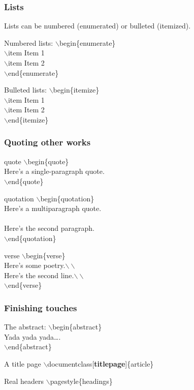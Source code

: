 \documentclass[ignorenonframetext]{beamer}
\begin{document}
\begin{frame}
  \frametitle{Lists}
  Lists can be numbered (enumerated) or bulleted (itemized).
  \begin{block}{Numbered lists:}
    $\backslash$begin\{enumerate\}\\
    \quad$\backslash$item Item 1\\
    \quad$\backslash$item Item 2\\
    $\backslash$end\{enumerate\}
  \end{block}
  \begin{block}{Bulleted lists:}
    $\backslash$begin\{itemize\}\\
    \quad$\backslash$item Item 1\\
    \quad$\backslash$item Item 2\\
    $\backslash$end\{itemize\}
  \end{block}
\end{frame}

\begin{frame}
  \frametitle{Quoting other works}
  \begin{block}{quote}
    \small$\backslash$begin\{quote\}\\
    \quad Here's a single-paragraph quote.\\
    $\backslash$end\{quote\}\normalsize
  \end{block}
  \begin{block}{quotation}
    \small$\backslash$begin\{quotation\}\\
    \quad Here's a multiparagraph quote.\\
    \\
    \quad Here's the second paragraph.\\
    $\backslash$end\{quotation\}\normalsize
  \end{block}
  \begin{block}{verse}
    \small$\backslash$begin\{verse\}\\
    \quad Here's some poetry.$\backslash\backslash$\\
    \quad Here's the second line.$\backslash\backslash$\\
    $\backslash$end\{verse\}\normalsize
  \end{block}
\end{frame}

\begin{frame}
  \frametitle{Finishing touches}
  \begin{block}{The abstract:}
    $\backslash$begin\{abstract\}\\
    \quad Yada yada yada\ldots.\\
    $\backslash$end\{abstract\}
  \end{block}
  \begin{block}{A title page}
    $\backslash$documentclass[\textbf{titlepage}]\{article\}
  \end{block}
  \begin{block}{Real headers}
    $\backslash$pagestyle\{headings\}
  \end{block}
\end{frame}
\end{document}
